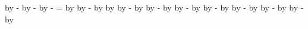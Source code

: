{{        \pgfextract@process\uppereastnorthjoin{\pgfpoint{\the\pgf@xa}{\the\pgf@ya}}
        \addtosavedmacro{\uppereastnorthjoin}
        \advance\pgf@ya by -\pgf@yb
        \pgfextract@process\uppereastsouthjoin{\pgfpoint{\the\pgf@xa}{\the\pgf@ya}}
        \addtosavedmacro{\uppereastsouthjoin}
        \advance\pgf@ya by -\scarceoffset
        \advance\pgf@xa by -\scarceoffset
        \pgfextract@process\uppersoutheastjoin{\pgfpoint{\the\pgf@xa}{\the\pgf@ya}}
        \addtosavedmacro{\uppersoutheastjoin}
        \pgf@xa=\pgf@xc
        \advance\pgf@xa by \scarceoffset
        \pgfextract@process\uppersouthwestjoin{\pgfpoint{\the\pgf@xa}{\the\pgf@ya}}
        \addtosavedmacro{\uppersouthwestjoin}
        \advance\pgf@xa by -\scarceoffset
        \advance\pgf@ya by \scarceoffset
        \pgfextract@process\upperwestsouthjoin{\pgfpoint{\the\pgf@xa}{\the\pgf@ya}}
        \addtosavedmacro{\upperwestsouthjoin}
        \upperwestnorthjoin
        \advance\pgf@x by \offset
        \advance\pgf@y by -\offset
        \pgfextract@process\lowerwestnorthjoin{\pgfpoint{\the\pgf@x}{\the\pgf@y}}
        \addtosavedmacro{\lowerwestnorthjoin}
        \uppernorthwestjoin
        \advance\pgf@x by \offset
        \advance\pgf@y by -\offset
        \pgfextract@process\lowernorthwestjoin{\pgfpoint{\the\pgf@x}{\the\pgf@y}}
        \addtosavedmacro{\lowernorthwestjoin}
        \uppernortheastjoin
        \advance\pgf@x by \offset
        \advance\pgf@y by -\offset
        \pgfextract@process\lowernortheastjoin{\pgfpoint{\the\pgf@x}{\the\pgf@y}}
        \addtosavedmacro{\lowernortheastjoin}
        \uppereastnorthjoin
        \advance\pgf@x by \offset
        \advance\pgf@y by -\offset
        \pgfextract@process\lowereastnorthjoin{\pgfpoint{\the\pgf@x}{\the\pgf@y}}
        \addtosavedmacro{\lowereastnorthjoin}
        \uppereastsouthjoin
        \advance\pgf@x by \offset
        \advance\pgf@y by -\offset
        \pgfextract@process\lowereastsouthjoin{\pgfpoint{\the\pgf@x}{\the\pgf@y}}
        \addtosavedmacro{\lowereastsouthjoin}
        \uppersoutheastjoin
        \advance\pgf@x by \offset
        \advance\pgf@y by -\offset
        \pgfextract@process\lowersoutheastjoin{\pgfpoint{\the\pgf@x}{\the\pgf@y}}
        \addtosavedmacro{\lowersoutheastjoin}
        \uppersouthwestjoin
        \advance\pgf@x by \offset
        \advance\pgf@y by -\offset
        \pgfextract@process\lowersouthwestjoin{\pgfpoint{\the\pgf@x}{\the\pgf@y}}
        \addtosavedmacro{\lowersouthwestjoin}
        \upperwestsouthjoin
        \advance\pgf@x by \offset
}}
